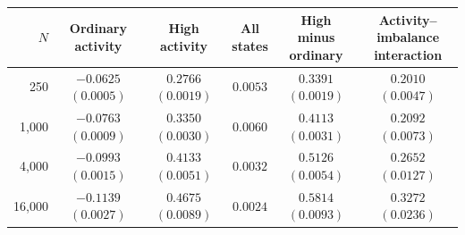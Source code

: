 \begin{tabular}{rccccc}
\toprule
\(N\) & \shortstack{Ordinary\\activity} & \shortstack{High\\activity} & \shortstack{All\\states} & \shortstack{High minus\\ordinary} & \shortstack{Activity--imbalance\\interaction} \\
\midrule
250 & \(-0.0625\) \((0.0005)\) & \(0.2766\) \((0.0019)\) & \(0.0053\) & \(0.3391\) \((0.0019)\) & \(0.2010\) \((0.0047)\) \\
1,000 & \(-0.0763\) \((0.0009)\) & \(0.3350\) \((0.0030)\) & \(0.0060\) & \(0.4113\) \((0.0031)\) & \(0.2092\) \((0.0073)\) \\
4,000 & \(-0.0993\) \((0.0015)\) & \(0.4133\) \((0.0051)\) & \(0.0032\) & \(0.5126\) \((0.0054)\) & \(0.2652\) \((0.0127)\) \\
16,000 & \(-0.1139\) \((0.0027)\) & \(0.4675\) \((0.0089)\) & \(0.0024\) & \(0.5814\) \((0.0093)\) & \(0.3272\) \((0.0236)\) \\
\bottomrule
\end{tabular}
